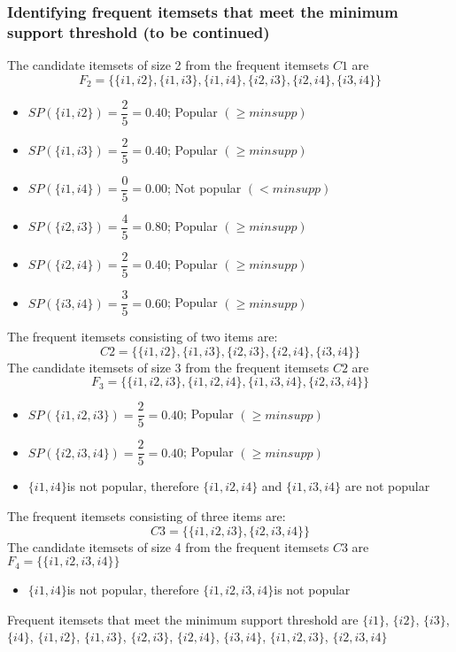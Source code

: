 \subsubsection{Identifying frequent itemsets that meet the minimum support threshold (to be continued)}
The candidate itemsets of size 2 from the frequent itemsets \(C1\) are \[F_2=\{\{i1,i2\},\{i1,i3\},\{i1,i4\},\{i2,i3\},\{i2,i4\},\{i3,i4\}\}\]
\begin{itemize}
\item \(SP(\{i1,i2\})=\dfrac{2}{5}=0.40\); Popular \((\geq minsupp)\)
\item \(SP(\{i1,i3\})=\dfrac{2}{5}=0.40\); Popular  \((\geq minsupp)\)
\item \(SP(\{i1,i4\})=\dfrac{0}{5}=0.00\); Not popular  \((< minsupp)\)
\item \(SP(\{i2,i3\})=\dfrac{4}{5}=0.80\); Popular  \((\geq minsupp)\)
\item \(SP(\{i2,i4\})=\dfrac{2}{5}=0.40\); Popular  \((\geq minsupp)\)
\item \(SP(\{i3,i4\})=\dfrac{3}{5}=0.60\); Popular  \((\geq minsupp)\)
\end{itemize}
The frequent itemsets consisting of two items are: \[C2=\{\{i1,i2\},\{i1,i3\},\{i2,i3\},\{i2,i4\},\{i3,i4\}\}\]
The candidate itemsets of size 3 from the frequent itemsets \(C2\) are \[F_3=\{\{i1,i2,i3\},\{i1,i2,i4\},\{i1,i3,i4\},\{i2,i3,i4\}\}\]
\begin{itemize}
\item \(SP(\{i1,i2,i3\})=\dfrac{2}{5}=0.40\); Popular \((\geq minsupp)\)
\item \(SP(\{i2,i3,i4\})=\dfrac{2}{5}=0.40\); Popular  \((\geq minsupp)\)
\item \(\{i1,i4\}\)is not popular, therefore \(\{i1, i2, i4\}\) and \(\{i1, i3, i4\}\) are not popular
\end{itemize}
The frequent itemsets consisting of three items are: \[C3=\{\{i1,i2,i3\},\{i2,i3,i4\}\}\]
The candidate itemsets of size 4 from the frequent itemsets \(C3\) are \(F_4=\{\{i1,i2,i3,i4\}\}\)
\begin{itemize}
\item \(\{i1,i4\}\)is not popular, therefore \(\{i1, i2, i3, i4\}\)is not popular
\end{itemize}
Frequent itemsets that meet the minimum support threshold are \(\{i1\}\), \(\{i2\}\), \(\{i3\}\), \(\{i4\}\), \(\{i1,i2\}\), \(\{i1,i3\}\), \(\{i2,i3\}\), \(\{i2,i4\}\), \(\{i3,i4\}\), \(\{i1,i2,i3\}\), \(\{i2,i3,i4\}\)

